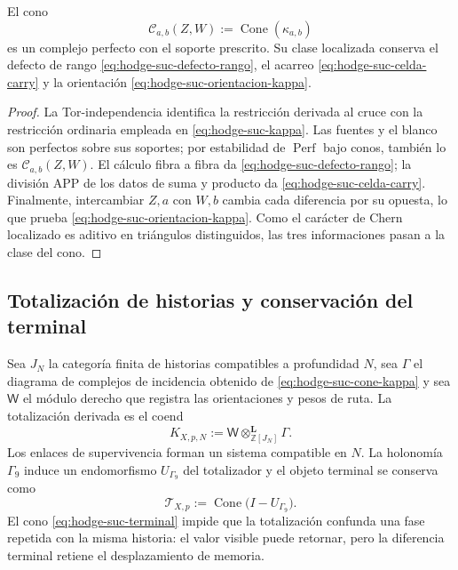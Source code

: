 \begin{proposition}
\label{prop:hodge-suc-celda-perf}
El cono
\begin{equation}\label{eq:hodge-suc-cone-kappa}
 \mathcal C_{a,b}(Z,W):=\operatorname{Cone}(\kappa_{a,b})
\end{equation}
es un complejo perfecto con el soporte prescrito. Su clase localizada
conserva el defecto de rango \eqref{eq:hodge-suc-defecto-rango}, el acarreo
\eqref{eq:hodge-suc-celda-carry} y la orientación
\eqref{eq:hodge-suc-orientacion-kappa}.
\end{proposition}

\begin{proof}
La Tor-independencia identifica la restricción derivada al cruce con la
restricción ordinaria empleada en \eqref{eq:hodge-suc-kappa}. Las fuentes y
el blanco son perfectos sobre sus soportes; por estabilidad de
\(\operatorname{Perf}\) bajo conos, también lo es
\(\mathcal C_{a,b}(Z,W)\). El cálculo fibra a fibra da
\eqref{eq:hodge-suc-defecto-rango}; la división APP de los datos de suma y
producto da \eqref{eq:hodge-suc-celda-carry}. Finalmente, intercambiar
\(Z,a\) con \(W,b\) cambia cada diferencia por su opuesta, lo que prueba
\eqref{eq:hodge-suc-orientacion-kappa}. Como el carácter de Chern localizado
es aditivo en triángulos distinguidos, las tres informaciones pasan a la
clase del cono.
\end{proof}

\subsection*{Totalización de historias y conservación del terminal}

Sea \(J_N\) la categoría finita de historias compatibles a profundidad
\(N\), sea \(\Gamma\) el diagrama de complejos de incidencia obtenido de
\eqref{eq:hodge-suc-cone-kappa} y sea \(\mathsf W\) el módulo derecho que
registra las orientaciones y pesos de ruta. La totalización derivada es el
coend
\begin{equation}\label{eq:hodge-suc-coend}
 K_{X,p,N}
 :=\mathsf W\otimes^{\mathbf L}_{\mathbb Z[J_N]}\Gamma.
\end{equation}
Los enlaces de supervivencia forman un sistema compatible en \(N\). La
holonomía \(\Gamma_9\) induce un endomorfismo
\(U_{\Gamma_9}\) del totalizador y el objeto terminal se conserva como
\begin{equation}\label{eq:hodge-suc-terminal}
 \mathcal T_{X,p}
 :=\operatorname{Cone}\bigl(I-U_{\Gamma_9}\bigr).
\end{equation}
El cono \eqref{eq:hodge-suc-terminal} impide que la totalización confunda
una fase repetida con la misma historia: el valor visible puede retornar,
pero la diferencia terminal retiene el desplazamiento de memoria.

